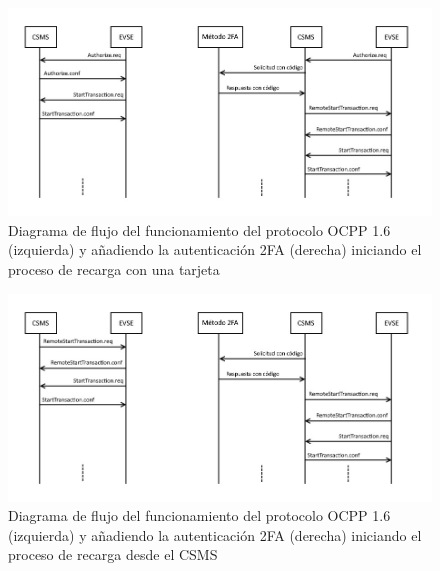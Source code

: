 \documentclass[12pt,a4paper,onecolumn,oneside]{report}
\begin{document}
\begin{figure}[H] 
\centering
  \includegraphics[width=1\textwidth]{figuras/diagrama2faauthorize.png}
  \caption[Diagrama de flujo del funcionamiento del protocolo OCPP 1.6 (izquierda) y añadiendo la autenticación 2FA (derecha) iniciando el proceso de recarga con una tarjeta]{Diagrama de flujo del funcionamiento del protocolo OCPP 1.6 (izquierda) y añadiendo la autenticación 2FA (derecha) iniciando el proceso de recarga con una tarjeta\\
  }
  \label{fig:diagrama2fa1}
\end{figure}

\begin{figure}[H] 
\centering
  \includegraphics[width=1\textwidth]{figuras/diagrama2farst.png}
  \caption[Diagrama de flujo del funcionamiento del protocolo OCPP 1.6 (izquierda) y añadiendo la autenticación 2FA (derecha) iniciando el proceso de recarga desde el CSMS]{Diagrama de flujo del funcionamiento del protocolo OCPP 1.6 (izquierda) y añadiendo la autenticación 2FA (derecha) iniciando el proceso de recarga desde el CSMS\\
  }
  \label{fig:diagrama2fa2}
\end{figure}
\end{document}
